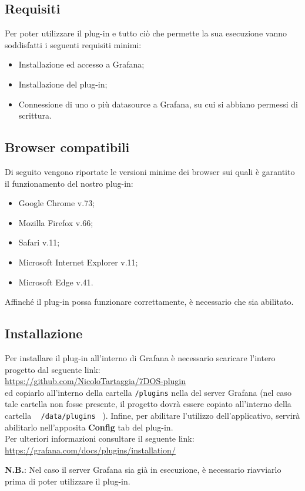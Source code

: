 \subsection{Requisiti}
Per poter utilizzare il plug-in e tutto ciò che permette la sua esecuzione vanno soddisfatti i seguenti requisiti minimi:
\begin{itemize}
	\item{Installazione ed accesso a Grafana;}
	\item{Installazione del plug-in;}
	\item{Connessione di uno o più datasource a Grafana, su cui si abbiano permessi di scrittura.}
\end{itemize}
\subsection{Browser compatibili}
Di seguito vengono riportate le versioni minime dei browser sui quali è garantito il funzionamento del nostro plug-in:
\begin{itemize}
	\item{Google Chrome v.73};
	\item{Mozilla Firefox v.66};
	\item{Safari v.11};
	\item{Microsoft Internet Explorer v.11};
	\item{Microsoft Edge v.41}. 
\end{itemize}
Affinché il plug-in possa funzionare correttamente, è necessario che  sia abilitato.
\subsection{Installazione}
Per installare il plug-in all'interno di Grafana è necessario scaricare l'intero progetto dal seguente link: \\[0.2cm]
\hspace*{10mm}\url{https://github.com/NicoloTartaggia/7DOS-plugin}\\[0.2cm]
ed copiarlo all'interno della cartella \texttt{/plugins} nella  del server Grafana (nel caso tale cartella non fosse presente, il progetto dovrà essere copiato all'interno della cartella ~ \texttt{/data/plugins} ~).
Infine, per abilitare l'utilizzo dell'applicativo, servirà abilitarlo nell'apposita \textbf{Config} tab del plug-in.\\
Per ulteriori informazioni consultare il seguente link:\\[0.2cm]
\hspace*{10mm}
\url{https://grafana.com/docs/plugins/installation/}

\textbf{N.B.}: Nel caso il server Grafana sia già in esecuzione, è necessario riavviarlo prima di poter utilizzare il plug-in.
\pagebreak
